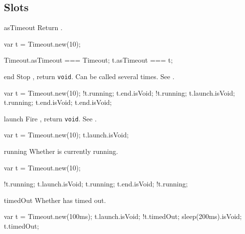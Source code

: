 \subsection{Slots}
\begin{urbiscriptapi}
\item[asTimeout] Return \this.
\begin{urbiassert}
var t = Timeout.new(10);

Timeout.asTimeout === Timeout;
      t.asTimeout === t;
\end{urbiassert}


\item[end] Stop \this, return \lstinline|void|.  Can be called several
  times.  See .

\begin{urbiassert}
var t = Timeout.new(10);
!t.running;
 t.end.isVoid;
!t.running;
t.launch.isVoid;
 t.running;
 t.end.isVoid;
 t.end.isVoid;
\end{urbiassert}

\item[launch]
  Fire \this, return \lstinline|void|.  See .

\begin{urbiassert}
var t = Timeout.new(10);
t.launch.isVoid;
\end{urbiassert}

\item[running]
  Whether is currently running.
\begin{urbiassert}
var t = Timeout.new(10);

!t.running;
 t.launch.isVoid;
 t.running;
 t.end.isVoid;
!t.running;
\end{urbiassert}


\item[timedOut]
  Whether \this has timed out.

\begin{urbiassert}
var t = Timeout.new(100ms);
 t.launch.isVoid;
!t.timedOut;
 sleep(200ms).isVoid;
 t.timedOut;
\end{urbiassert}


\end{urbiscriptapi}

